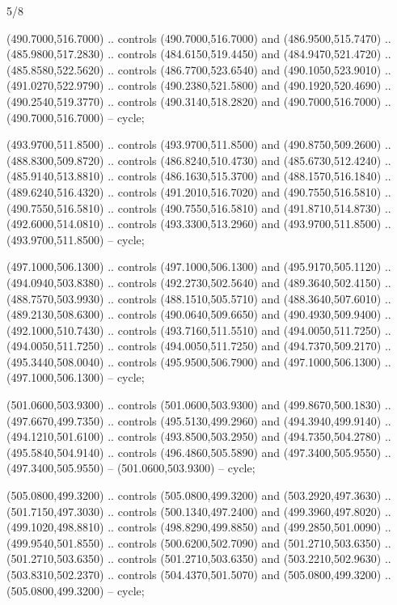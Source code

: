 \begin{flagdescription}{5/8}
\begin{scope}[shift={(m)}]
\begin{scope}[scale=\flagwidth/220,y=0.1mm, x=0.1mm, yscale=-1,shift={(-596,-360)}]
\begin{scope}[draw=black,line join=round,line cap=round,line width=0.381\lw]
\begin{scope}[fill=olive]
 (490.7000,516.7000) .. controls (490.7000,516.7000) and
  (486.9500,515.7470) .. (485.9800,517.2830) .. controls (484.6150,519.4450) and
  (484.9470,521.4720) .. (485.8580,522.5620) .. controls (486.7700,523.6540) and
  (490.1050,523.9010) .. (491.0270,522.9790) .. controls (490.2380,521.5800) and
  (490.1920,520.4690) .. (490.2540,519.3770) .. controls (490.3140,518.2820) and
  (490.7000,516.7000) .. (490.7000,516.7000) -- cycle;

 (493.9700,511.8500) .. controls (493.9700,511.8500) and
  (490.8750,509.2600) .. (488.8300,509.8720) .. controls (486.8240,510.4730) and
  (485.6730,512.4240) .. (485.9140,513.8810) .. controls (486.1630,515.3700) and
  (488.1570,516.1840) .. (489.6240,516.4320) .. controls (491.2010,516.7020) and
  (490.7550,516.5810) .. (490.7550,516.5810) .. controls (490.7550,516.5810) and
  (491.8710,514.8730) .. (492.6000,514.0810) .. controls (493.3300,513.2960) and
  (493.9700,511.8500) .. (493.9700,511.8500) -- cycle;

 (497.1000,506.1300) .. controls (497.1000,506.1300) and
  (495.9170,505.1120) .. (494.0940,503.8380) .. controls (492.2730,502.5640) and
  (489.3640,502.4150) .. (488.7570,503.9930) .. controls (488.1510,505.5710) and
  (488.3640,507.6010) .. (489.2130,508.6300) .. controls (490.0640,509.6650) and
  (490.4930,509.9400) .. (492.1000,510.7430) .. controls (493.7160,511.5510) and
  (494.0050,511.7250) .. (494.0050,511.7250) .. controls (494.0050,511.7250) and
  (494.7370,509.2170) .. (495.3440,508.0040) .. controls (495.9500,506.7900) and
  (497.1000,506.1300) .. (497.1000,506.1300) -- cycle;

 (501.0600,503.9300) .. controls (501.0600,503.9300) and
  (499.8670,500.1830) .. (497.6670,499.7350) .. controls (495.5130,499.2960) and
  (494.3940,499.9140) .. (494.1210,501.6100) .. controls (493.8500,503.2950) and
  (494.7350,504.2780) .. (495.5840,504.9140) .. controls (496.4860,505.5890) and
  (497.3400,505.9550) .. (497.3400,505.9550) -- (501.0600,503.9300) -- cycle;

 (505.0800,499.3200) .. controls (505.0800,499.3200) and
  (503.2920,497.3630) .. (501.7150,497.3030) .. controls (500.1340,497.2400) and
  (499.3960,497.8020) .. (499.1020,498.8810) .. controls (498.8290,499.8850) and
  (499.2850,501.0090) .. (499.9540,501.8550) .. controls (500.6200,502.7090) and
  (501.2710,503.6350) .. (501.2710,503.6350) .. controls (501.2710,503.6350) and
  (503.2210,502.9630) .. (503.8310,502.2370) .. controls (504.4370,501.5070) and
  (505.0800,499.3200) .. (505.0800,499.3200) -- cycle;


\end{scope}
\end{scope}
\end{scope}
\end{scope}
\end{flagdescription}
